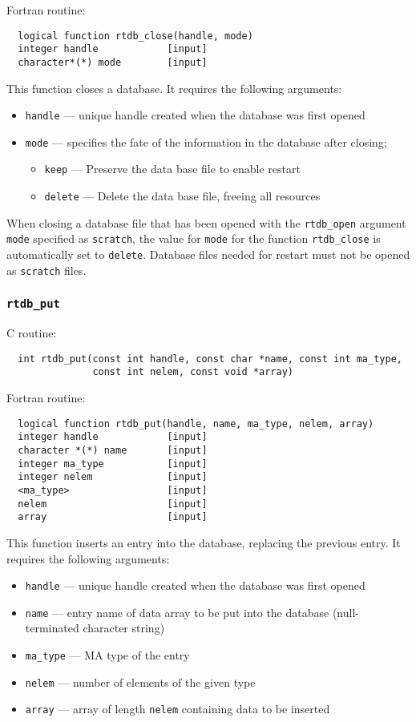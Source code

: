 Fortran routine:

\begin{verbatim}
  logical function rtdb_close(handle, mode)
  integer handle            [input]
  character*(*) mode        [input]
\end{verbatim}
This function closes a database. It requires the following arguments:
\begin{itemize}
\item {\tt handle} --- unique handle created when the database was first opened
\item {\tt mode} --- specifies the fate of the information in the database after closing;
\begin{itemize}
\item {\tt keep} ---    Preserve the data base file to enable restart
\item {\tt delete} ---  Delete the data base file, freeing all resources
\end{itemize}
\end{itemize}
When closing a database file that has been opened with the {\tt rtdb\_open} argument
{\tt mode} specified as {\tt scratch}, the value for {\tt mode} for the function
{\tt rtdb\_close} is automatically set to {\tt delete}.  Database files needed for
restart must not be opened as {\tt scratch} files.

\subsubsection{{\tt rtdb\_put}}

C routine:

\begin{verbatim}
  int rtdb_put(const int handle, const char *name, const int ma_type,
               const int nelem, const void *array)
\end{verbatim}


Fortran routine:

\begin{verbatim}
  logical function rtdb_put(handle, name, ma_type, nelem, array)
  integer handle            [input]
  character *(*) name       [input]
  integer ma_type           [input]
  integer nelem             [input]
  <ma_type>                 [input]
  nelem                     [input]
  array                     [input]
\end{verbatim}
This function inserts an entry into the database, replacing the previous entry.
It requires the following arguments:
\begin{itemize}
\item {\tt handle} --- unique handle created when the database was first opened
\item {\tt name} --- entry name of data array to be put into the database (null-terminated character string)
\item {\tt ma\_type} --- MA type of the entry
\item {\tt nelem} --- number of elements of the given type
\item {\tt array} --- array of length {\tt nelem} containing data to be inserted
\end{itemize}

